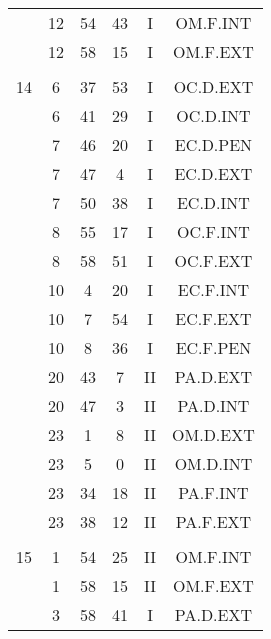 \documentclass[12pt, a4paper]{article}
\begin{document}
\begin{multicols}{3}
{\begin{tabular}{c c c c c c}
	 	 	 	 & 12 & 54 & 43 & I & OM.F.INT\\%
	 	 	 	 & 12 & 58 & 15 & I & OM.F.EXT\\%
	 	 	 	 & & & & & \\%
	 	 	 	14 & 6 & 37 & 53 & I & OC.D.EXT\\%
	 	 	 	 & 6 & 41 & 29 & I & OC.D.INT\\%
	 	 	 	 & 7 & 46 & 20 & I & EC.D.PEN\\%
	 	 	 	 & 7 & 47 & 4 & I & EC.D.EXT\\%
	 	 	 	 & 7 & 50 & 38 & I & EC.D.INT\\%
	 	 	 	 & 8 & 55 & 17 & I & OC.F.INT\\%
	 	 	 	 & 8 & 58 & 51 & I & OC.F.EXT\\%
	 	 	 	 & 10 & 4 & 20 & I & EC.F.INT\\%
	 	 	 	 & 10 & 7 & 54 & I & EC.F.EXT\\%
	 	 	 	 & 10 & 8 & 36 & I & EC.F.PEN\\%
	 	 	 	 & 20 & 43 & 7 & II & PA.D.EXT\\%
	 	 	 	 & 20 & 47 & 3 & II & PA.D.INT\\%
	 	 	 	 & 23 & 1 & 8 & II & OM.D.EXT\\%
	 	 	 	 & 23 & 5 & 0 & II & OM.D.INT\\%
	 	 	 	 & 23 & 34 & 18 & II & PA.F.INT\\%
	 	 	 	 & 23 & 38 & 12 & II & PA.F.EXT\\%
	 	 	 	 & & & & & \\%
	 	 	 	15 & 1 & 54 & 25 & II & OM.F.INT\\%
	 	 	 	 & 1 & 58 & 15 & II & OM.F.EXT\\%
	 	 	 	 & 3 & 58 & 41 & I & PA.D.EXT\\%

\end{tabular}}
\end{multicols}
\end{document}
